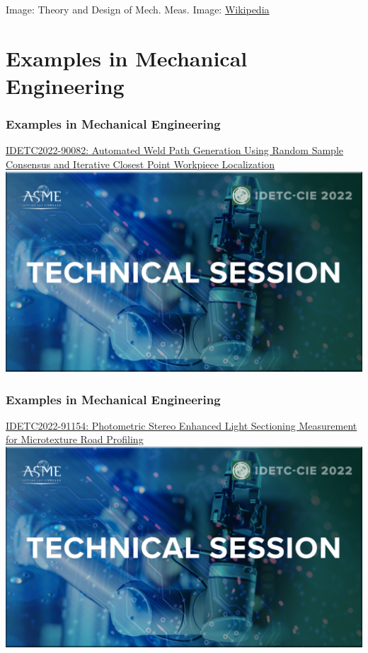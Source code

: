 \documentclass[fleqn]{beamer} %
\newcommand{\sectiontitleIV}{Examples in Mechanical Engineering }
\begin{document}
\begin{frame}
{\tiny Image: Theory and Design of Mech. Meas. \hspace{20mm} Image: \href{https://en.wikipedia.org/wiki/Thermocouple}{Wikipedia} }
\end{frame}

\section{\sectiontitleIV}

\begin{frame}[label=sectionIV]
\frametitle{\sectiontitleIV}
\href{https://events-platform.asmeconferences.org/event/idetc-cie-2022/planning/UGxhbm5pbmdfOTcxNDk4}{IDETC2022-90082: Automated Weld Path Generation Using Random Sample Consensus and Iterative Closest Point Workpiece Localization}\vspace{5mm}\\

\includegraphics[scale=0.125]{IDETC_technical_session.png}

\end{frame}

\begin{frame}[label=sectionIV]
\frametitle{\sectiontitleIV}

\href{https://events-platform.asmeconferences.org/event/idetc-cie-2022/planning/UGxhbm5pbmdfOTcxMzIx}{IDETC2022-91154: Photometric Stereo Enhanced Light Sectioning Measurement for Microtexture Road Profiling}\vspace{5mm}\\

\includegraphics[scale=0.125]{IDETC_technical_session.png}
 
\end{frame}
\end{document}
